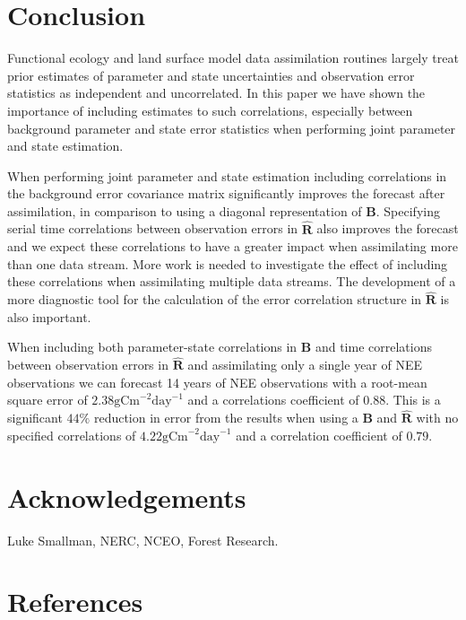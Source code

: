 \documentclass[review]{elsarticle}
\begin{document}
\section{Conclusion}

Functional ecology and land surface model data assimilation routines largely treat prior estimates of parameter and state uncertainties and observation error statistics as independent and uncorrelated. In this paper we have shown the importance of including estimates to such correlations, especially between background parameter and state error statistics when performing joint parameter and state estimation.

When performing joint parameter and state estimation including correlations in the background error covariance matrix significantly improves the forecast after assimilation, in comparison to using a diagonal representation of $\textbf{B}$. Specifying serial time correlations between observation errors in $\hat{\textbf{R}}$ also improves the forecast and we expect these correlations to have a greater impact when assimilating more than one data stream. More work is needed to investigate the effect of including these correlations when assimilating multiple data streams. The development of a more diagnostic tool for the calculation of the error correlation structure in $\hat{\textbf{R}}$ is also important.  

When including both parameter-state correlations in $\textbf{B}$ and time correlations between observation errors in $\hat{\textbf{R}}$ and assimilating only a single year of NEE observations we can forecast 14 years of NEE observations with a root-mean square error of $2.38\text{gCm}^{-2}\text{day}^{-1}$ and a correlations coefficient of $0.88$. This is a significant $44\%$ reduction in error from the results when using a $\textbf{B}$ and $\hat{\textbf{R}}$ with no specified correlations of $4.22\text{gCm}^{-2}\text{day}^{-1}$ and a correlation coefficient of $0.79$.

\section{Acknowledgements}

Luke Smallman, NERC, NCEO, Forest Research.

\section*{References}


\end{document}
